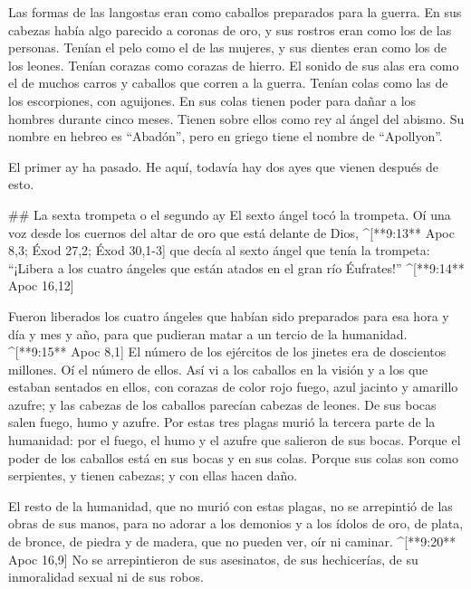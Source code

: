\begin{paracols}{2}
 Las formas de las langostas eran como caballos preparados para la guerra. En sus cabezas había algo parecido a coronas de oro, y sus rostros eran como los de las personas.  Tenían el pelo como el de las mujeres, y sus dientes eran como los de los leones.  Tenían corazas como corazas de hierro. El sonido de sus alas era como el de muchos carros y caballos que corren a la guerra.  Tenían colas como las de los escorpiones, con aguijones. En sus colas tienen poder para dañar a los hombres durante cinco meses.  Tienen sobre ellos como rey al ángel del abismo. Su nombre en hebreo es “Abadón”, pero en griego tiene el nombre de “Apollyon”.

 El primer ay ha pasado. He aquí, todavía hay dos ayes que vienen después de esto.

## La sexta trompeta o el segundo ay
 El sexto ángel tocó la trompeta. Oí una voz desde los cuernos del altar de oro que está delante de Dios, ^[**9:13** Apoc 8,3; Éxod 27,2; Éxod 30,1-3]  que decía al sexto ángel que tenía la trompeta: “¡Libera a los cuatro ángeles que están atados en el gran río Éufrates!” ^[**9:14** Apoc 16,12]

 Fueron liberados los cuatro ángeles que habían sido preparados para esa hora y día y mes y año, para que pudieran matar a un tercio de la humanidad. ^[**9:15** Apoc 8,1]  El número de los ejércitos de los jinetes era de doscientos millones. Oí el número de ellos.  Así vi a los caballos en la visión y a los que estaban sentados en ellos, con corazas de color rojo fuego, azul jacinto y amarillo azufre; y las cabezas de los caballos parecían cabezas de leones. De sus bocas salen fuego, humo y azufre.  Por estas tres plagas murió la tercera parte de la humanidad: por el fuego, el humo y el azufre que salieron de sus bocas.  Porque el poder de los caballos está en sus bocas y en sus colas. Porque sus colas son como serpientes, y tienen cabezas; y con ellas hacen daño.

 El resto de la humanidad, que no murió con estas plagas, no se arrepintió de las obras de sus manos, para no adorar a los demonios y a los ídolos de oro, de plata, de bronce, de piedra y de madera, que no pueden ver, oír ni caminar. ^[**9:20** Apoc 16,9]  No se arrepintieron de sus asesinatos, de sus hechicerías, de su inmoralidad sexual ni de sus robos.


\end{paracols}

